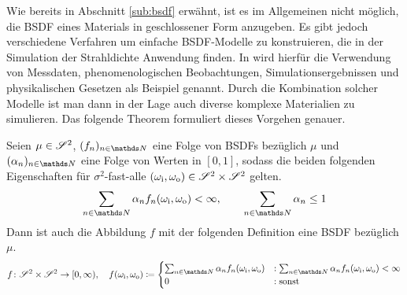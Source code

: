 		Wie bereits in Abschnitt \ref{sub:bsdf} erwähnt, ist es im Allgemeinen nicht möglich, die BSDF eines Materials in geschlossener Form anzugeben.
		Es gibt jedoch verschiedene Verfahren um einfache BSDF-Modelle zu konstruieren, die in der Simulation der Strahldichte Anwendung finden.
		In \cite[S.~507~f]{pbrt3} wird hierfür die Verwendung von Messdaten, phenomenologischen Beobachtungen, Simulationsergebnissen und physikalischen Gesetzen als Beispiel genannt.
		Durch die Kombination solcher Modelle ist man dann in der Lage auch diverse komplexe Materialien zu simulieren.
		Das folgende Theorem formuliert dieses Vorgehen genauer.
		\begin{theorem*}
			Seien $\mu\in\mathscr{S}^{2}$, $(f_n)_{n\in\SN}$ eine Folge von BSDFs bezüglich $\mu$ und $(\alpha_n)_{n\in\SN}$ eine Folge von Werten in $[0,1]$, sodass die beiden folgenden Eigenschaften für $\sigma^2$-fast-alle $(\omega_{\mathrm{i}},\omega_{\mathrm{o}})\in\mathscr{S}^{2}\times\mathscr{S}^{2}$ gelten.
			\[
				\sum_{n\in\SN}\alpha_n f_n(\omega_\m{i},\omega_\m{o}) < \infty ,\qquad \sum_{n\in\SN}\alpha_n \leq 1
			\]
			Dann ist auch die Abbildung $f$ mit der folgenden Definition eine BSDF bezüglich $\mu$.
			\[
				\func{f}{\ssp\times\ssp}{[0,\infty)},\quad f(\omega_\m{i},\omega_\m{o})\define
				\begin{cases}
					\sum_{n\in\SN}\alpha_n f_n(\omega_\m{i},\omega_\m{o}) &: \sum_{n\in\SN}\alpha_n f_n(\omega_\m{i},\omega_\m{o}) < \infty \\
					0 &: \m{sonst}
				\end{cases}
			\]
		\end{theorem*}
